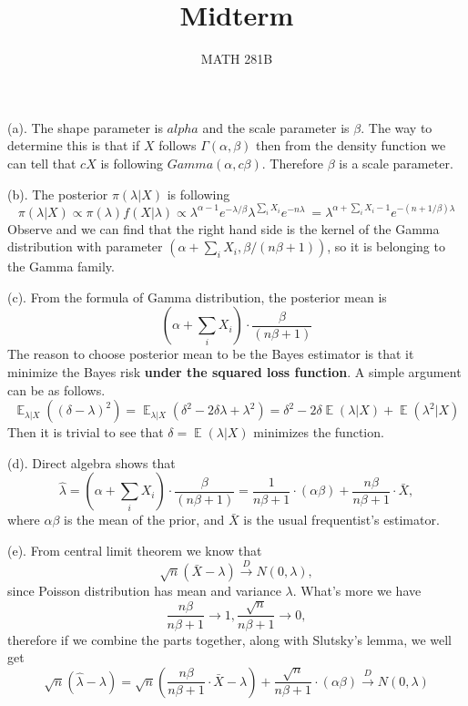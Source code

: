 \documentclass[12pt]{article}
\newcommand{\1}{\mathbbm{1}}
\newenvironment{problem}[2][Problem]{\begin{trivlist}
\item[\hskip \labelsep {\bfseries #1}\hskip \labelsep {\bfseries #2.}]}{\end{trivlist}}
\newcommand{\E}{\operatorname{\mathbb{E}}}
\begin{document}
\title{Midterm}%
\author{MATH 281B} %
\maketitle
\begin{problem}{1}
\end{problem}

(a). The shape parameter is $alpha$ and the scale parameter is $\beta$. The way to determine this is that if $X$ follows $\Gamma(\alpha,\beta)$ then from the density function we can tell that $cX$ is following $Gamma(\alpha,c\beta)$. Therefore $\beta$ is a scale parameter.

(b). The posterior $\pi(\lambda | X)$ is following
$$
\pi (\lambda |X) \propto \pi(\lambda) f(X|\lambda) \propto \lambda^{\alpha -1} e^{-\lambda/\beta} \lambda^{\sum_i X_i} e^{-n\lambda} \ = \lambda^{\alpha+\sum_i X_i -1 }  e^{-(n+1/\beta)\lambda}
$$
Observe and we can find that the right hand side is the kernel of the Gamma distribution with parameter $(\alpha +\sum_i X_i, \beta/(n\beta +1))$, so it is belonging to the Gamma family.

(c). From the formula of Gamma distribution, the posterior mean is 
$$
(\alpha +\sum_i X_i) \cdot \frac{\beta}{(n\beta +1)}
$$ 
The reason to choose posterior mean to be the Bayes estimator is that it minimize the Bayes risk \textbf{under the squared loss function}. A simple argument can be as follows.
$$
\E_{\lambda|X} ((\delta - \lambda)^2 ) = \E_{\lambda|X} (\delta^2 - 2\delta \lambda + \lambda^2 ) = \delta^2 -2\delta \E (\lambda|X) + \E (\lambda^2|X)
$$
Then it is trivial to see that $\delta  = \E (\lambda|X)$ minimizes the function.

(d). Direct algebra shows that
$$
\hat{\lambda} = (\alpha +\sum_i X_i) \cdot \frac{\beta}{(n\beta +1)} = \frac{1}{n\beta +1} \cdot (\alpha \beta) + \frac{n\beta}{n\beta +1} \cdot \bar{X},
$$
where $\alpha \beta$ is the mean of the prior, and $\bar{X}$ is the usual frequentist's estimator.

(e). From central limit theorem we know that
$$
\sqrt{n} (\bar{X} - \lambda) \xrightarrow{D} N(0,\lambda),
$$
since Poisson distribution has mean and variance $\lambda$. What's more we have
$$
\frac{n\beta}{n\beta +1} \rightarrow 1,  \frac{\sqrt{n}}{n\beta +1}  \rightarrow 0,
$$
therefore if we combine the parts together, along with Slutsky's lemma, we well get
$$
\sqrt{n} (\hat{\lambda} - \lambda) = \sqrt{n} (\frac{n\beta}{n\beta +1} \cdot \bar{X} - \lambda) + \frac{\sqrt{n}}{n\beta +1} \cdot (\alpha \beta) \xrightarrow{D} N(0,\lambda)
$$
\end{document}
